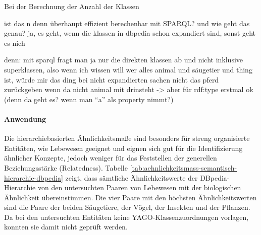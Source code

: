 Bei der Berechnung der Anzahl der Klassen 

ist das n denn überhaupt effizient berechenbar mit SPARQL? und wie geht das genau?
ja, es geht, wenn die klassen in dbpedia schon expandiert sind, sonst geht es nich

denn:
mit sparql fragt man ja nur die direkten klassen ab und nicht inklusive superklassen,
also wenn ich wissen will wer alles animal und säugetier und thing ist, würde mir das ding bei nicht expandierten sachen nicht das pferd zurückgeben wenn da nicht animal mit drinsteht
-> aber für rdf:type erstmal ok (denn da geht es? wenn man "`a"' als property nimmt?)
\fi
\paragraph{Anwendung}
Die hierarchiebasierten Ähnlichkeitsmaße sind besonders für streng organisierte Entitäten, wie \zb Lebewesen geeignet und eignen sich gut für die Identifizierung ähnlicher Konzepte,
jedoch weniger für das Feststellen der generellen Beziehungsstärke (Relatedness).
Tabelle \ref{tab:aehnlichkeitsmass-semantisch-hierarchie-dbpedia} zeigt, dass sämtliche Ähnlichkeitswerte der DBpedia-Hierarchie von den untersuchten Paaren von Lebewesen 
mit der biologischen Ähnlichkeit übereinstimmen. Die vier Paare mit den höchsten Ähnlichkeitswerten sind die Paare der beiden Säugetiere, der Vögel, der Insekten und der Pflanzen.
Da bei den untersuchten Entitäten keine YAGO-Klassenzuordnungen vorlagen, konnten sie damit nicht geprüft werden.
